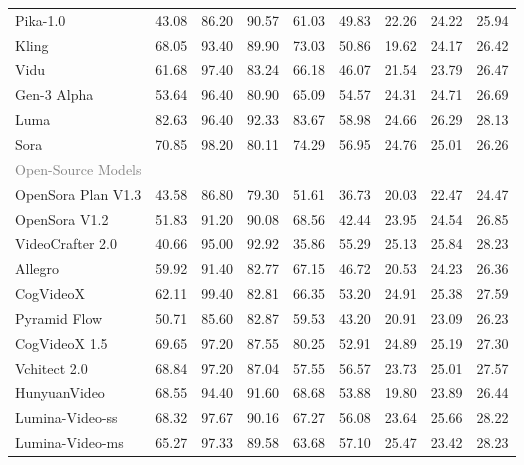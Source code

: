 \begin{table}[htbp]
{\begin{tabular}{lcccccccc}
        Pika-1.0      & 43.08 & 86.20 & 90.57 & 61.03 & 49.83 & 22.26 & 24.22 & 25.94 \\
        Kling         & 68.05 & 93.40 & 89.90 & 73.03 & 50.86 & 19.62 & 24.17 & 26.42 \\   
        Vidu          & 61.68 & 97.40 & 83.24 & 66.18 & 46.07 & 21.54 & 23.79 & 26.47 \\
        Gen-3 Alpha   & 53.64 & 96.40 & 80.90 & 65.09 & 54.57 & 24.31 & 24.71 & 26.69 \\
        Luma          & 82.63 & 96.40 & 92.33 & 83.67 & 58.98 & 24.66 & 26.29 & 28.13 \\
        Sora          & 70.85 & 98.20 & 80.11 & 74.29 & 56.95 & 24.76 & 25.01 & 26.26 \\
        \midrule
        \multicolumn{9}{l}{\textcolor{gray}{Open-Source Models}} \\
        OpenSora Plan V1.3 & 43.58 & 86.80 & 79.30 & 51.61 & 36.73 & 20.03 & 22.47 & 24.47 \\
        OpenSora V1.2 & 51.83 & 91.20 & 90.08 & 68.56 & 42.44 & 23.95 & 24.54 & 26.85 \\
        VideoCrafter 2.0 & 40.66 & 95.00 & 92.92 & 35.86 & 55.29 & 25.13 & 25.84 & 28.23 \\
        Allegro       & 59.92 & 91.40 & 82.77 & 67.15 & 46.72 & 20.53 & 24.23 & 26.36 \\
        CogVideoX     & 62.11 & 99.40 & 82.81 & 66.35 & 53.20 & 24.91 & 25.38 & 27.59 \\
        Pyramid Flow   & 50.71 & 85.60 & 82.87 & 59.53 & 43.20 & 20.91 & 23.09 & 26.23 \\
        CogVideoX 1.5 & 69.65 & 97.20 & 87.55 & 80.25 & 52.91 & 24.89 & 25.19 & 27.30 \\
        Vchitect 2.0  & 68.84 & 97.20 & 87.04 & 57.55 & 56.57 & 23.73 & 25.01 & 27.57 \\
        HunyuanVideo  & 68.55 & 94.40 & 91.60 & 68.68 & 53.88 & 19.80 & 23.89 & 26.44 \\
        Lumina-Video-ss & 68.32	&97.67	&90.16	&67.27	&56.08	&23.64	&25.66	&28.22 \\
        Lumina-Video-ms &65.27	&97.33	&89.58	&63.68	&57.10	&25.47	&23.42	&28.23 \\
        \bottomrule
    \end{tabular}
    }
\end{table}